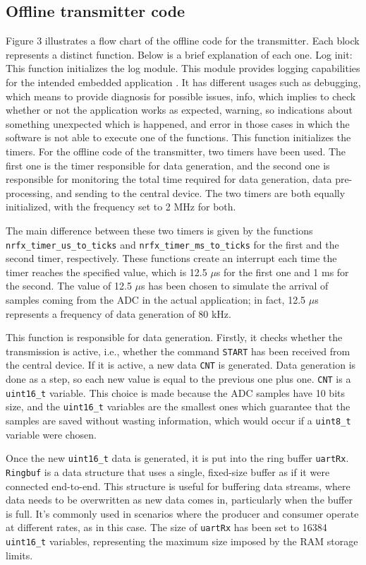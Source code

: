 \documentclass{Configuration_Files/PoliMi3i_thesis}
\begin{document}
\subsection{Offline transmitter code}
Figure 3 illustrates a flow chart of the offline code for the transmitter. Each block represents a distinct function. Below is a brief explanation of each one.
Log init: This function initializes the log module. This module provides logging capabilities for the intended embedded application \cite{NordicSemiconductorInfocentera}. It has different usages such as debugging, which means to provide diagnosis for possible issues, info, which implies to check whether or not the application works as expected, warning, so indications about something unexpected which is happened, and error in those cases in which the software is not able to execute one of the functions.
This function initializes the timers. For the offline code of the transmitter, two timers have been used. The first one is the timer responsible for data generation, and the second one is responsible for monitoring the total time required for data generation, data pre-processing, and sending to the central device. The two timers are both equally initialized, with the frequency set to 2 MHz for both.

The main difference between these two timers is given by the functions \texttt{nrfx\_timer\_us\_to\_ticks} and \texttt{nrfx\_timer\_ms\_to\_ticks} for the first and the second timer, respectively. These functions create an interrupt each time the timer reaches the specified value, which is 12.5 $\mu$s for the first one and 1 ms for the second. The value of 12.5 $\mu$s has been chosen to simulate the arrival of samples coming from the ADC in the actual application; in fact, 12.5 $\mu$s represents a frequency of data generation of 80 kHz.

This function is responsible for data generation. Firstly, it checks whether the transmission is active, i.e., whether the command \texttt{START} has been received from the central device. If it is active, a new data \texttt{CNT} is generated. Data generation is done as a step, so each new value is equal to the previous one plus one. \texttt{CNT} is a \texttt{uint16\_t} variable. This choice is made because the ADC samples have 10 bits size, and the \texttt{uint16\_t} variables are the smallest ones which guarantee that the samples are saved without wasting information, which would occur if a \texttt{uint8\_t} variable were chosen.

Once the new \texttt{uint16\_t} data is generated, it is put into the ring buffer \texttt{uartRx}. \texttt{Ringbuf} is a data structure that uses a single, fixed-size buffer as if it were connected end-to-end. This structure is useful for buffering data streams, where data needs to be overwritten as new data comes in, particularly when the buffer is full. It's commonly used in scenarios where the producer and consumer operate at different rates, as in this case. The size of \texttt{uartRx} has been set to 16384 \texttt{uint16\_t} variables, representing the maximum size imposed by the RAM storage limits.
\end{document}

